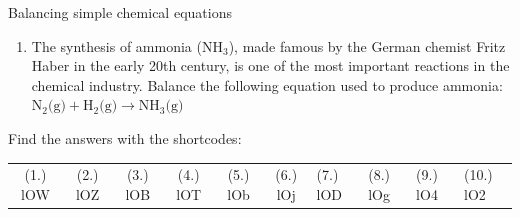 \begin{exercises}{ Balancing simple chemical equations
        }
\begin{enumerate}[noitemsep, label=\textbf{\arabic*}. ]
\label{m38726*uid18}\item The synthesis of ammonia ($\text{NH}_{3}$), made famous by the German chemist Fritz Haber in the early 20th century, is one of the most important reactions in the chemical industry. Balance the following equation used to produce ammonia:
$\text{N}_{2} \text{(g)} + \text{H}_{2} \text{(g)} \to \text{NH}_{3} \text{(g)}$
\end{enumerate}
  \label{m38726**end}
\par {} Find the answers with the shortcodes:
 \par \begin{tabular}[h]{cccccc}
 (1.) lOW  &  (2.) lOZ   &  (3.) lOB  &  (4.) lOT  &  (5.) lOb  &  (6.) lOj  &  (7.) lOD  &  (8.) lOg  &  (9.) lO4  &  (10.) lO2  & \end{tabular}
\end{exercises}
